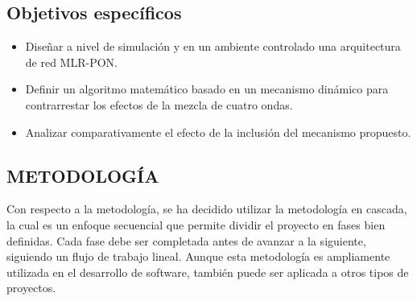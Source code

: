 \subsection{Objetivos específicos}
\begin{itemize}
    
    \item Diseñar a nivel de simulación y en un ambiente controlado una arquitectura de red MLR-PON.

    \item Definir un algoritmo matemático basado en un mecanismo dinámico para contrarrestar los efectos de la mezcla de cuatro ondas.

    \item Analizar comparativamente el efecto de la inclusión del mecanismo propuesto.
\end{itemize}

\begin{center}
    \item  \section{METODOLOGÍA}
\end{center}
Con respecto a la metodología, se ha decidido utilizar la metodología en cascada, la cual es un enfoque secuencial que permite dividir el proyecto en fases bien definidas. Cada fase debe ser completada antes de avanzar a la siguiente, siguiendo un flujo de trabajo lineal. Aunque esta metodología es ampliamente utilizada en el desarrollo de software, también puede ser aplicada a otros tipos de proyectos.